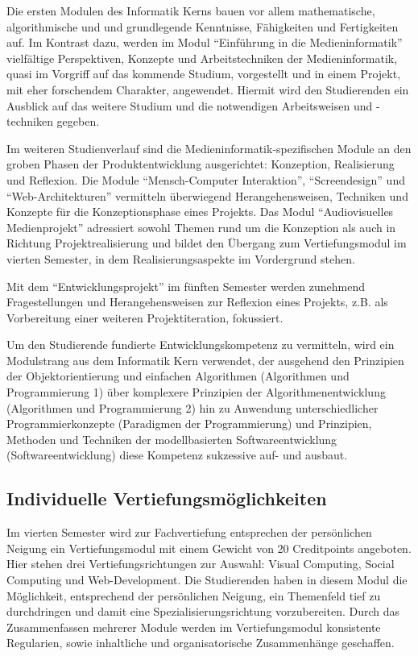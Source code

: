 Die ersten Modulen des Informatik Kerns bauen vor allem mathematische,
algorithmische und und grundlegende Kenntnisse, Fähigkeiten und
Fertigkeiten auf. Im Kontrast dazu, werden im Modul ``Einführung in die
Medieninformatik'' vielfältige Perspektiven, Konzepte und
Arbeitstechniken der Medieninformatik, quasi im Vorgriff auf das
kommende Studium, vorgestellt und in einem Projekt, mit eher forschendem
Charakter, angewendet. Hiermit wird den Studierenden ein Ausblick auf
das weitere Studium und die notwendigen Arbeitsweisen und -techniken
gegeben.

Im weiteren Studienverlauf sind die Medieninformatik-spezifischen Module
an den groben Phasen der Produktentwicklung ausgerichtet: Konzeption,
Realisierung und Reflexion. Die Module ``Mensch-Computer Interaktion'',
``Screendesign'' und ``Web-Architekturen'' vermitteln überwiegend
Herangehensweisen, Techniken und Konzepte für die Konzeptionsphase eines
Projekts. Das Modul ``Audiovisuelles Medienprojekt'' adressiert sowohl
Themen rund um die Konzeption als auch in Richtung Projektrealisierung
und bildet den Übergang zum Vertiefungsmodul im vierten Semester, in dem
Realisierungsaspekte im Vordergrund stehen.

Mit dem ``Entwicklungsprojekt'' im fünften Semester werden zunehmend
Fragestellungen und Herangehensweisen zur Reflexion eines Projekts, z.B.
als Vorbereitung einer weiteren Projektiteration, fokussiert.

Um den Studierende fundierte Entwicklungskompetenz zu vermitteln, wird
ein Modulstrang aus dem Informatik Kern verwendet, der ausgehend den
Prinzipien der Objektorientierung und einfachen Algorithmen (Algorithmen
und Programmierung 1) über komplexere Prinzipien der
Algorithmenentwicklung (Algorithmen und Programmierung 2) hin zu
Anwendung unterschiedlicher Programmierkonzepte (Paradigmen der
Programmierung) und Prinzipien, Methoden und Techniken der
modellbasierten Softwareentwicklung (Softwareentwicklung) diese
Kompetenz sukzessive auf- und ausbaut.

\subsection{Individuelle
Vertiefungsmöglichkeiten}\label{individuelle-vertiefungsmuxf6glichkeiten}

Im vierten Semester wird zur Fachvertiefung entsprechen der persönlichen
Neigung ein Vertiefungsmodul mit einem Gewicht von 20 Creditpoints
angeboten. Hier stehen drei Vertiefungsrichtungen zur Auswahl: Visual
Computing, Social Computing und Web-Development. Die Studierenden haben
in diesem Modul die Möglichkeit, entsprechend der persönlichen Neigung,
ein Themenfeld tief zu durchdringen und damit eine
Spezialisierungsrichtung vorzubereiten. Durch das Zusammenfassen
mehrerer Module werden im Vertiefungsmodul konsistente Regularien, sowie
inhaltliche und organisatorische Zusammenhänge geschaffen.

